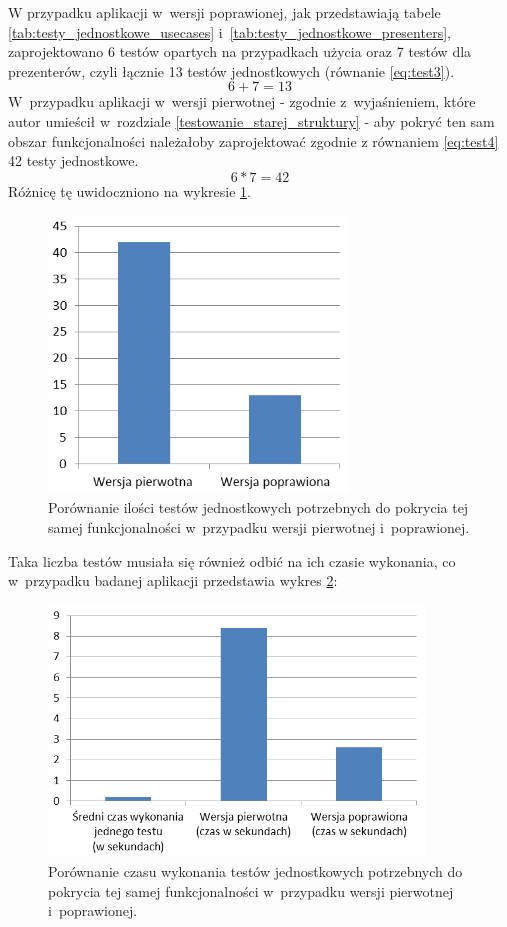 \newpage
W przypadku aplikacji w~wersji poprawionej, jak przedstawiają tabele \ref{tab:testy_jednostkowe_usecases} i~\ref{tab:testy_jednostkowe_presenters}, zaprojektowano 6 testów opartych na przypadkach użycia oraz 7 testów dla prezenterów, czyli łącznie 13 testów jednostkowych (równanie \ref{eq:test3}).
\begin{equation}
6+7 = 13 \label{eq:test3}
\end{equation}
W~przypadku aplikacji w~wersji pierwotnej - zgodnie z~wyjaśnieniem, które autor umieścił w~rozdziale \ref{testowanie_starej_struktury} - aby pokryć ten sam obszar funkcjonalności należałoby zaprojektować zgodnie z równaniem \ref{eq:test4} 42 testy jednostkowe.
\begin{equation}
6*7 = 42 \label{eq:test4}
\end{equation}
Różnicę tę uwidoczniono na wykresie \ref{fig:app_ut_liczba}.
\begin{figure}[!htb]
    \centering
    \includegraphics[width=8cm]{imgs/ch6_app_ut_liczba.png}
    \caption
{Porównanie ilości testów jednostkowych potrzebnych do pokrycia tej samej funkcjonalności w~przypadku wersji pierwotnej i~poprawionej. }
    \label{fig:app_ut_liczba}
\end{figure} 

Taka liczba testów musiała się również odbić na ich czasie wykonania, co w~przypadku badanej aplikacji przedstawia wykres \ref{fig:app_ut_czas}:
\begin{figure}[!htb]
    \centering
    \includegraphics[width=10cm]{imgs/ch6_app_ut_czas.png}
    \caption
{Porównanie czasu wykonania testów jednostkowych potrzebnych do pokrycia tej samej funkcjonalności w~przypadku wersji pierwotnej i~poprawionej. }
    \label{fig:app_ut_czas}
\end{figure} 

